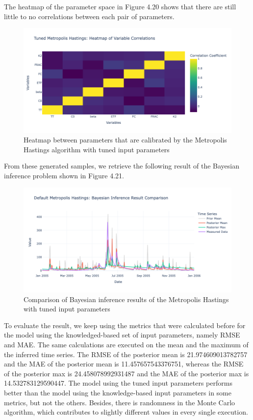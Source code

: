 The heatmap of the parameter space in Figure 4.20 shows that there are still little to no correlations between each pair of parameters.
\begin{figure}
    \centering
    \includegraphics[width=1\textwidth]{figures/basic_mh/tuned_mh/tuned_mh_heatmap.png}
    \captionsetup{width=.8\textwidth}
    \caption{Heatmap between parameters that are calibrated by the Metropolis Hastings algorithm with tuned input parameters}
    \label{fig:enter-label}
\end{figure}

From these generated samples, we retrieve the following result of the Bayesian inference problem shown in Figure 4.21.

\begin{figure}
    \centering
    \includegraphics[width=1\textwidth] {figures/basic_mh/tuned_mh/tuned_mh_bayes.png}
    \captionsetup{width=.8\textwidth}
    \caption{Comparison of Bayesian inference results of the Metropolis Hastings with tuned input parameters}
    \label{fig:enter-label}
\end{figure}

To evaluate the result, we keep using the metrics that were calculated before for the model using the knowledged-based set of input parameters, namely RMSE and MAE. The same calculations are executed on the mean and the maximum of the inferred time series. The RMSE of the posterior mean is 21.974609013782757 and the MAE of the posterior mean is 11.457657543376751, whereas the RMSE of the posterior max is 24.458078992931487 and the MAE of the posterior max is 14.532783129590447. The model using the tuned input parameters performs better than the model using the knowledge-based input parameters in some metrics, but not the others. Besides, there is randomness in the Monte Carlo algorithm,\cite{monte_carlo_randomness} which contributes to slightly different values in every single execution.

